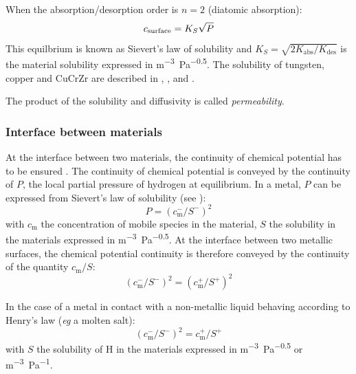 When the absorption/desorption order is $n=2$ (diatomic absorption):
\begin{equation}
    c_\mathrm{surface} = K_S \sqrt{P}
    \labeq{sievert's law}
\end{equation}
This equilbrium is known as Sievert's law of solubility and $K_S = \sqrt{2 K_\mathrm{abs}/K_\mathrm{des}}$ is the material solubility expressed in \si{m^{-3}.Pa^{-0.5}}.
The solubility of tungsten, copper and CuCrZr are described in , ,  and .

The product of the solubility and diffusivity is called \textit{permeability}.

\subsubsection{Interface between materials}
At the interface between two materials, the continuity of chemical potential has to be ensured .
The continuity of chemical potential is conveyed by the continuity of $P$, the local partial pressure of hydrogen at equilibrium.
In a metal, $P$ can be expressed from Sievert's law of solubility (see ):
\begin{equation}
    P = (c_\mathrm{m}^-/S^-)^2
\end{equation}
with $c_\mathrm{m}$ the concentration of mobile species in the material, $S$ the solubility in the materials expressed in \si{m^{-3}.Pa^{-0.5}}.
At the interface between two metallic surfaces, the chemical potential continuity is therefore conveyed by the continuity of the quantity $c_\mathrm{m}/S$:
\begin{equation}
    (c_\mathrm{m}^-/S^-)^2 = (c_\mathrm{m}^+/S^+)^2
    \label{eq: c/s conservation}
\end{equation}

In the case of a metal in contact with a non-metallic liquid behaving according to Henry's law (\textit{eg} a molten salt):
\begin{equation}
    (c_\mathrm{m}^-/S^-)^2 = c_\mathrm{m}^+/S^+
\end{equation}
with $S$ the solubility of H in the materials expressed in \si{m^{-3}.Pa^{-0.5}} or \si{m^{-3}.Pa^{-1}}.

